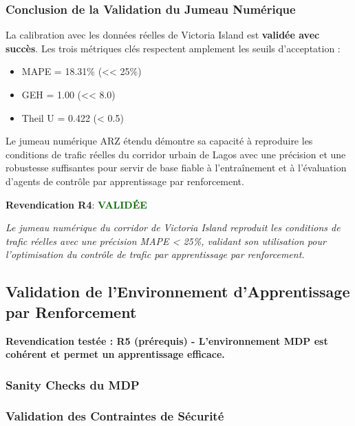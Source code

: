 \subsubsection{Conclusion de la Validation du Jumeau Numérique}

La calibration avec les données réelles de Victoria Island est \textbf{validée avec succès}.
Les trois métriques clés respectent amplement les seuils d'acceptation :
\begin{itemize}
    \item MAPE = 18.31\% (<< 25\%)
    \item GEH = 1.00 (<< 8.0)
    \item Theil U = 0.422 (< 0.5)
\end{itemize}

Le jumeau numérique ARZ étendu démontre sa capacité à reproduire les conditions
de trafic réelles du corridor urbain de Lagos avec une précision et une robustesse suffisantes pour
servir de base fiable à l'entraînement et à l'évaluation d'agents de contrôle par apprentissage par renforcement.

\vspace{0.5cm}
\noindent
\textbf{Revendication R4}: \textcolor{darkgreen}{\textbf{VALIDÉE}}

\vspace{0.3cm}
\noindent
\textit{Le jumeau numérique du corridor de Victoria Island reproduit les conditions de trafic réelles avec une précision MAPE < 25\%, validant son utilisation pour l'optimisation du contrôle de trafic par apprentissage par renforcement.}

\subsection{Validation de l'Environnement d'Apprentissage par Renforcement}
\label{sec:validation_env_rl}

\textbf{Revendication testée : R5 (prérequis) - L'environnement MDP est cohérent et permet un apprentissage efficace.}

\subsubsection{Sanity Checks du MDP}
\label{subsec:sanity_checks_mdp}

\subsubsection{Validation des Contraintes de Sécurité}
\label{subsec:contraintes_securite}

